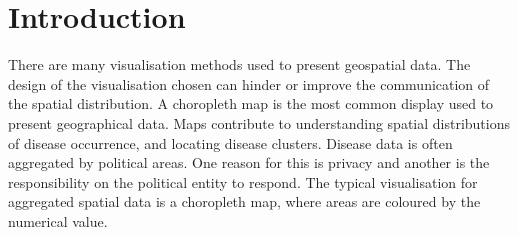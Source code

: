 \documentclass{monashthesis}
\begin{document}
\begin{Shaded}
\begin{Highlighting}[]
\StringTok{ }\OperatorTok{::}\NormalTok{(}
   \NormalTok{(}\NormalTok{(}\NormalTok{, }\NormalTok{)),}
   \NormalTok{(}\NormalTok{(}\OperatorTok{:}\NormalTok{)),}
   \NormalTok{(}
    \NormalTok{,}
    \NormalTok{,}
    \NormalTok{,}
    \NormalTok{,}
    \NormalTok{,}
    \NormalTok{)}
\NormalTok{)}
\end{Highlighting}
\end{Shaded}

\hypertarget{ch:intro}{%
\chapter{Introduction}\label{ch:intro}}

There are many visualisation methods used to present geospatial data. The design of the visualisation chosen can hinder or improve the communication of the spatial distribution. A choropleth map is the most common display used to present geographical data. Maps contribute to understanding spatial distributions of disease occurrence, and locating disease clusters. Disease data is often aggregated by political areas. One reason for this is privacy and another is the responsibility on the political entity to respond. The typical visualisation for aggregated spatial data is a choropleth map, where areas are coloured by the numerical value.
\end{document}

